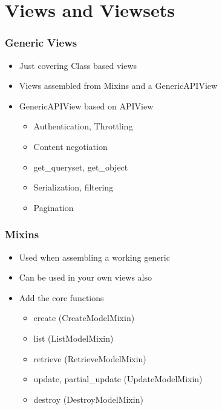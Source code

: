 \documentclass{beamer}
\begin{document}
\section{Views and Viewsets}
\begin{frame}[fragile]

  \frametitle{Generic Views}

  \begin{itemize}
  \item Just covering Class based views
  \item Views assembled from Mixins and a GenericAPIView
  \item GenericAPIView based on APIView 
  	\begin{itemize}
		\item Authentication, Throttling
		\item Content negotiation
		\item get\_queryset, get\_object
        		\item Serialization, filtering
		\item Pagination
	\end{itemize}
  \end{itemize}
  
\end{frame}

\begin{frame}[fragile]

  \frametitle{Mixins}

  \begin{itemize}
    	\item Used when assembling a working generic
	\item Can be used in your own views also
      	\item Add the core functions
		\begin{itemize}
    			\item create (CreateModelMixin)
    			\item list (ListModelMixin)
    			\item retrieve (RetrieveModelMixin)
            		\item update, partial\_update (UpdateModelMixin)
    			\item destroy (DestroyModelMixin)
    		\end{itemize}
  \end{itemize}
  
\end{frame}
\end{document}
